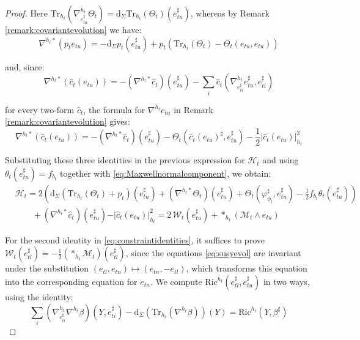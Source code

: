 \documentclass[10pt,reqno,a4paper]{amsart}
\theoremstyle{plain}
\theoremstyle{definition}
\theoremstyle{remark}
\theoremstyle{remark}
\def\dd{\mathrm{d}}
\newcommand{\Tr}{\mathrm{Tr}}
\def\cH{\mathcal{H}}
\def\cM{\mathcal{M}}
\def\cW{\mathcal{W}}
\def\cH{\mathcal{H}}
\newcommand{\Ric}{\mathrm{Ric}}
\renewcommand{\(}{ (}
\renewcommand{\)}{ )}
\begin{document}
\begin{proof}
\noindent
Here $\Tr_{h_t}(\nabla^{h_t}_{e^{\sharp}_{tu}}\Theta_t) = \dd_{\Sigma}\Tr_{h_t}(\Theta_t)(e^{\sharp}_{tu})$, whereas by Remark \ref{remark:covariantevolution} we have:
\begin{equation*}
\nabla^{h_t\ast}(p_t e_{tu}) = - \dd_{\Sigma} p_t (e^{\sharp}_{tu}) + p_t (\Tr_{h_t}(\Theta_t) - \Theta_t(e_{tu},e_{tu}))    
\end{equation*}

\noindent
and, since:
\begin{equation*}
\nabla^{h_t\ast}(\widehat{c}_t (e_{tu})) = -(\nabla^{h_t\ast}\widehat{c}_t )(e^{\sharp}_{tu}) - \sum_{i} \widehat{c}_t  (\nabla^{h_t}_{e^{\sharp}_{ti}} e^{\sharp}_{tu}, e^{\sharp}_{ti})    
\end{equation*}

\noindent
for every two-form $\widehat{c}_t $, the formula for $\nabla^{h_t} e_{tu}$ in Remark \ref{remark:covariantevolution} gives:
\begin{equation*}
\nabla^{h_t\ast}(\widehat{c}_t (e_{tu})) = -(\nabla^{h_t\ast}\widehat{c}_t )(e^{\sharp}_{tu}) - \Theta_t (\widehat{c}_t (e_{tu})^{\sharp}, e^{\sharp}_{tu}) - \frac{1}{2}\vert \widehat{c}_t (e_{tu})\vert^2_{h_t}
\end{equation*}

\noindent
Substituting these three identities in the previous expression for $\cH_t$ and using $\theta_t(e^{\sharp}_{tu}) = f_{b_t}$ together with \eqref{eq:Maxwellnormalcomponent}, we obtain:
\begin{eqnarray*}
& \cH_t = 2 ( \dd_{\Sigma}(\Tr_{h_t}(\Theta_t) + p_t)(e^{\sharp}_{tu}) + (\nabla^{h_t\ast}\Theta_t)(e^{\sharp}_{tu}) + \Theta_t(\varphi_{\phi_t}^{\sharp}, e^{\sharp}_{tu}) - \frac{1}{2} f_{b_t}\theta_t(e^{\sharp}_{tu})) \\
& \qquad + (\nabla^{h_t\ast}\widehat{c}_t )(e^{\sharp}_{tu}) - \vert \widehat{c}_t (e_{tu})\vert^2_{h_t} = 2\, \cW_t(e^{\sharp}_{tu}) + \ast_{h_t} (\cM_t\wedge e_{tu})
\end{eqnarray*}

\noindent
For the second identity in \eqref{eq:constraintidentities}, it suffices to prove $\cW_t(e^{\sharp}_{tl}) = -\frac{1}{2}(\ast_{h_t}\cM_t)(e^{\sharp}_{tl})$, since the equations \eqref{eq:susyevol} are invariant under the substitution $(e_{tl},e_{tn}) \mapsto (e_{tn},-e_{tl})$, which transforms this equation into the corresponding equation for $e_{tn}$. We compute $\Ric^{h_t}(e^{\sharp}_{tl},e^{\sharp}_{tu})$ in two ways, using the identity:
\begin{equation*}
\sum_i (\nabla^{h_t}_{e^{\sharp}_{ti}}\nabla^{h_t}\beta)(Y,e^{\sharp}_{ti}) - \dd_{\Sigma}(\Tr_{h_t}(\nabla^{h_t}\beta))(Y) = \Ric^{h_t}(Y,\beta^{\sharp})    
\end{equation*}


\end{proof}
\end{document}
